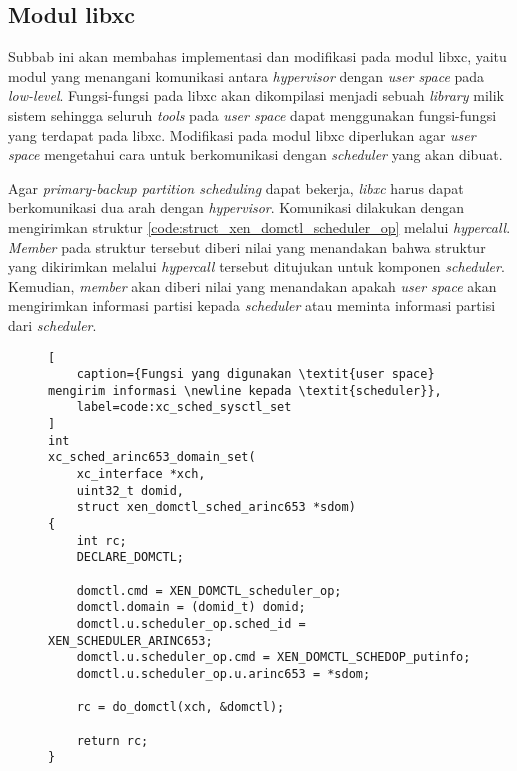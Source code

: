 \subsection{Modul libxc}
\label{section:modul_libxc}

Subbab ini akan membahas implementasi dan modifikasi pada modul libxc, yaitu modul yang
menangani komunikasi antara \textit{hypervisor} dengan \textit{user space} pada
\textit{low-level}. Fungsi-fungsi pada libxc akan dikompilasi menjadi sebuah \textit{library}
milik sistem sehingga seluruh \textit{tools} pada \textit{user space} dapat menggunakan
fungsi-fungsi yang terdapat pada libxc. Modifikasi pada modul libxc diperlukan agar \textit{user
space} mengetahui cara untuk berkomunikasi dengan \textit{scheduler} yang akan dibuat.

Agar \textit{primary-backup partition scheduling} dapat bekerja, \textit{libxc} harus dapat
berkomunikasi dua arah dengan \textit{hypervisor}. Komunikasi dilakukan dengan mengirimkan
struktur \autoref{code:struct_xen_domctl_scheduler_op} melalui \textit{hypercall}.
\textit{Member}  pada struktur tersebut diberi nilai yang menandakan bahwa
struktur yang dikirimkan melalui \textit{hypercall} tersebut ditujukan untuk komponen
\textit{scheduler}. Kemudian, \textit{member}  akan diberi nilai yang menandakan
apakah \textit{user space} akan mengirimkan informasi partisi kepada \textit{scheduler} atau
meminta informasi partisi dari \textit{scheduler}.

\begin{figure}
\begin{lstlisting}[
	caption={Fungsi yang digunakan \textit{user space} mengirim informasi \newline kepada \textit{scheduler}},
	label=code:xc_sched_sysctl_set
]
int
xc_sched_arinc653_domain_set(
    xc_interface *xch,
    uint32_t domid,
    struct xen_domctl_sched_arinc653 *sdom)
{
    int rc;
    DECLARE_DOMCTL;

    domctl.cmd = XEN_DOMCTL_scheduler_op;
    domctl.domain = (domid_t) domid;
    domctl.u.scheduler_op.sched_id = XEN_SCHEDULER_ARINC653;
    domctl.u.scheduler_op.cmd = XEN_DOMCTL_SCHEDOP_putinfo;
    domctl.u.scheduler_op.u.arinc653 = *sdom;

    rc = do_domctl(xch, &domctl);

    return rc;
}
\end{lstlisting}
\end{figure}

